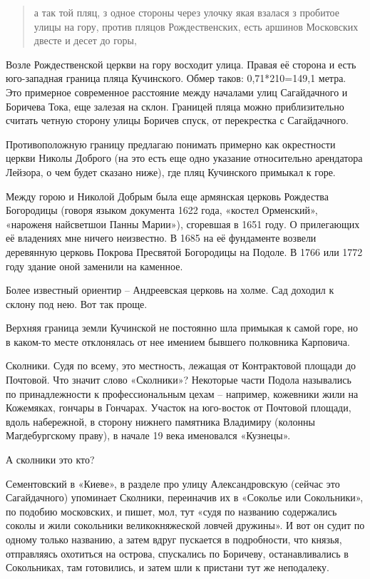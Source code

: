 \begin{quotation}
а так той пляц, з одное стороны через улочку якая взалася з пробитое улицы на гору, против пляцов Рождественских, есть аршинов Московских двесте и десет до горы, 
\end{quotation}

Возле Рождественской церкви на гору восходит улица. Правая её сторона и есть юго-западная граница пляца Кучинского. Обмер таков: 0,71*210=149,1 метра. Это примерное современное расстояние между началами улиц Сагайдачного и Боричева Тока, еще залезая на склон. Границей пляца можно приблизительно считать четную сторону улицы Боричев спуск, от перекрестка с Сагайдачного.

Противоположную границу предлагаю понимать примерно как окрестности церкви Николы Доброго (на это есть еще одно указание относительно арендатора Лейзора, о чем будет сказано ниже), где пляц Кучинского примыкал к горе. 

Между горою и Николой Добрым была еще армянская церковь Рождества Богородицы (говоря языком документа 1622 года, «костел Орменский», «нароженя найсветшои Панны Марии»), сгоревшая в 1651 году. О прилегающих её владениях мне ничего неизвестно. В 1685 на её фундаменте возвели деревянную церковь Покрова Пресвятой Богородицы на Подоле. В 1766 или 1772 году здание оной заменили на каменное.

Более известный ориентир – Андреевская церковь на холме. Сад доходил к склону под нею. Вот так проще.

Верхняя граница земли Кучинской не постоянно шла примыкая к самой горе, но в каком-то месте отклонялась от нее имением бывшего полковника Карповича.

Сколники. Судя по всему, это местность, лежащая от Контрактовой площади до Почтовой. Что значит слово «Сколники»? Некоторые части Подола назывались по принадлежности к профессиональным цехам – например, кожевники жили на Кожемяках, гончары в Гончарах. Участок на юго-восток от Почтовой площади, вдоль набережной, в сторону нижнего памятника Владимиру (колонны Магдебургскому праву), в начале 19 века именовался «Кузнецы».

А сколники это кто? 

Сементовский в «Киеве»\cite{sement01}, в разделе про улицу Александровскую (сейчас это Сагайдачного) упоминает Сколники, переиначив их в «Соколье или Сокольники», по подобию московских, и пишет, мол, тут «судя по названию содержались соколы и жили сокольники великокняжеской ловчей дружины». И вот он судит по одному только названию, а затем вдруг пускается в подробности, что князья, отправляясь охотиться на острова, спускались по Боричеву, останавливались в Сокольниках, там готовились, и затем шли к пристани тут же неподалеку.

